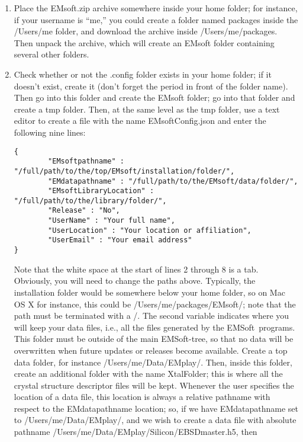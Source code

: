 \documentclass[DIV=calc, paper=letter, fontsize=11pt]{scrartcl}	 %
\newcommand{\ctp}{\textsf{EMSoft}}
\begin{document}
\begin{enumerate}
\item Place the \textsf{EMsoft.zip} archive somewhere inside your home folder; for instance, if your username is ``me,'' you could create 
a folder named \textsf{packages} inside the \textsf{/Users/me} folder, and download the archive inside \textsf{/Users/me/packages}.
Then unpack the archive, which will create an \textsf{EMsoft} folder containing several other folders.

\item Check whether or not the \textsf{.config} folder exists in your home folder; if it doesn't exist, create it (don't forget the 
period in front of the folder name). Then go into this folder and create the \textsf{EMsoft} folder; go into
that folder and create a \textsf{tmp} folder.  Then, at the same level as the tmp folder, use a text editor to
create a file with the name \textsf{EMsoftConfig.json} and enter the following nine lines:
\begin{verbatim}
{
        "EMsoftpathname" : "/full/path/to/the/top/EMsoft/installation/folder/",
        "EMdatapathname" : "/full/path/to/the/EMsoft/data/folder/",
        "EMsoftLibraryLocation" : "/full/path/to/the/library/folder/",
        "Release" : "No",
        "UserName" : "Your full name",
        "UserLocation" : "Your location or affiliation",
        "UserEmail" : "Your email address"
}
\end{verbatim}
Note that the white space at the start of lines 2 through 8 is a tab.  Obviously, you will need to change the paths above.
Typically, the installation folder would be somewhere below your home folder, so on Mac OS X for instance, this 
could be \textsf{/Users/me/packages/EMsoft/};  note that the path must be terminated with a \textsf{/}.
The second variable indicates where you will keep your data files, i.e., all the files generated by the \ctp\ programs.
This folder must be outside of the main \ctp-tree, so that no data will be overwritten when future updates or releases
become available.  Create a top data folder, for instance \textsf{/Users/me/Data/EMplay/}.  Then, inside this folder,
create an additional folder with the name \textsf{XtalFolder}; this is where all the crystal structure descriptor files 
will be kept.  Whenever the user specifies the location of a data file, this location is always a relative pathname
with respect to the \textsf{EMdatapathname} location;  so, if we have \textsf{EMdatapathname} set to \textsf{/Users/me/Data/EMplay/},
and we wish to create a data file with absolute pathname \textsf{/Users/me/Data/EMplay/Silicon/EBSDmaster.h5}, then

\end{enumerate}
\end{document}
